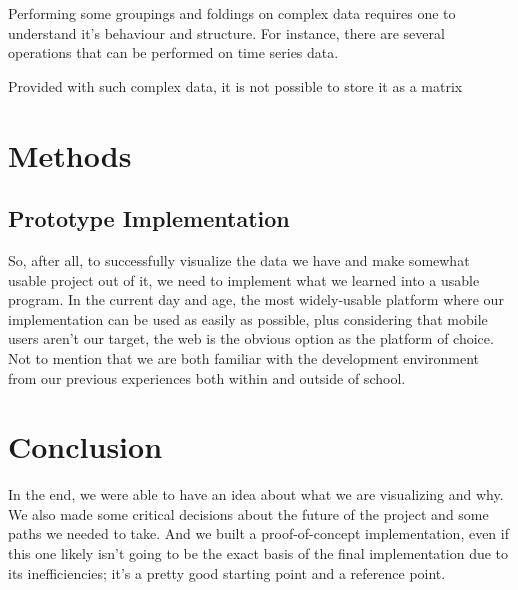\documentclass[11pt]{article}
\begin{document}
Performing some groupings and foldings on complex data requires one to understand it's behaviour and structure. For instance, there are several operations that can be performed on time series data. 

Provided with such complex data, it is not possible to store it as a matrix 


\section{Methods}



\subsection {Prototype Implementation}


So, after all, to successfully visualize the data we have and make somewhat usable project out of it, we need to implement what we learned into a usable program. In the current day and age, the most widely-usable platform where our implementation can be used as easily as possible, plus considering that mobile users aren't our target, the web is the obvious option as the platform of choice. Not to mention that we are both familiar with the development environment from our previous experiences both within and outside of school.

\section {Conclusion} 

In the end, we were able to have an idea about what we are visualizing and why. We also made some critical decisions about the future of the project and some paths we needed to take. And we built a proof-of-concept implementation, even if this one likely isn't going to be the exact basis of the final implementation due to its inefficiencies; it's a pretty good starting point and a reference point.

\end{document}
